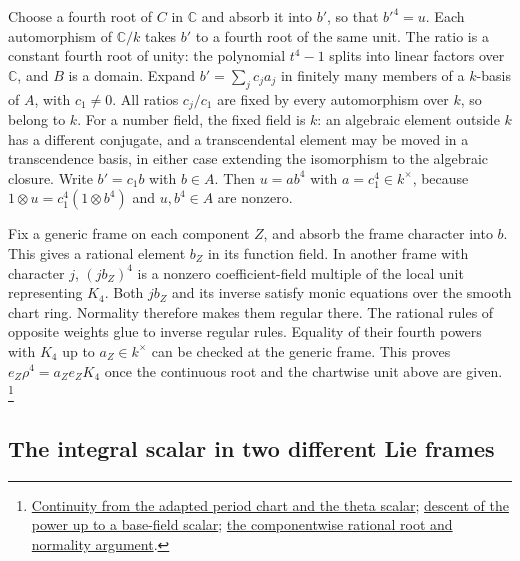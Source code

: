Choose a fourth root of \(C\) in \(\mathbb C\) and absorb it into
\(b'\), so that \(b'^4=u\). Each automorphism of \(\mathbb C/k\)
takes \(b'\) to a fourth root of the same unit. The ratio is a
constant fourth root of unity: the polynomial \(t^4-1\) splits into
linear factors over \(\mathbb C\), and \(B\) is a domain. Expand
\(b'=\sum_j c_j a_j\) in finitely many members of a \(k\)-basis of
\(A\), with \(c_1\ne0\). All ratios \(c_j/c_1\) are fixed by every
automorphism over \(k\), so belong to \(k\). For a number field,
the fixed field is \(k\): an algebraic element outside \(k\) has a
different conjugate, and a transcendental element may be moved in
a transcendence basis, in either case extending the isomorphism
to the algebraic closure. Write \(b'=c_1 b\) with \(b\in A\).
Then \(u=a b^4\) with \(a=c_1^4\in k^\times\), because
\(1\otimes u=c_1^4(1\otimes b^4)\) and \(u,b^4\in A\) are nonzero.

Fix a generic frame on each component \(Z\), and absorb the
frame character into \(b\). This gives a rational element \(b_Z\)
in its function field. In another frame with character \(j\),
\((j b_Z)^4\) is a nonzero coefficient-field multiple of the local
unit representing \(K_4\). Both \(j b_Z\) and its inverse satisfy
monic equations over the smooth chart ring. Normality therefore
makes them regular there. The rational rules of opposite weights
glue to inverse regular rules. Equality of their fourth powers with
\(K_4\) up to \(a_Z\in k^\times\) can be checked at the generic
frame. This proves \(e_Z\rho^4=a_Ze_ZK_4\) once the continuous
root and the chartwise unit above are given.
\footnote{\href{https://github.com/ChristianKudeba/alpoge-rh-verification/blob/alpoge-source-7cbf7a0c/src/Development/AbelianVarietyTheory/Proofs/IwasawaDecomposition/ContinuousOnKeySectionComplexValue.lean}{Continuity from the adapted period chart and the theta scalar};
\href{https://github.com/ChristianKudeba/alpoge-rh-verification/blob/alpoge-source-7cbf7a0c/src/Development/AbelianVarietyTheory/Proofs/IwasawaDecomposition/ExistsKeySectionUnif.lean}{descent of the power up to a base-field scalar};
\href{https://github.com/ChristianKudeba/alpoge-rh-verification/blob/alpoge-source-7cbf7a0c/src/Development/AbelianVarietyTheory/Proofs/DivisorProofs/ExistsKeySectionFourthRootPerComponent.lean}{the componentwise rational root and normality argument}.}

\subsection{The integral scalar in two different Lie frames}

